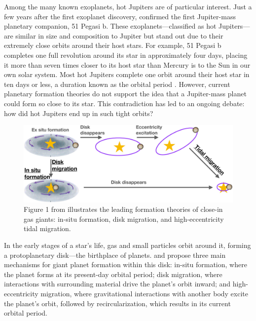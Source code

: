\documentclass[oneside,12pt]{amsart}
\numberwithin{page}{section}
\begin{document}
Among the many known exoplanets, hot Jupiters are of particular interest. Just a few years after the first exoplanet discovery, \citet{mayor1995pegasi51b} confirmed the first Jupiter-mass planetary companion, 51 Pegasi b. These exoplanets—classified as hot Jupiters—are similar in size and composition to Jupiter but stand out due to their extremely close orbits around their host stars. For example, 51 Pegasi b completes one full revolution around its star in approximately four days, placing it more than seven times closer to its host star than Mercury is to the Sun in our own solar system. Most hot Jupiters complete one orbit around their host star in ten days or less, a duration known as the orbital period \citep{fortney2021hotjupiters}. However, current planetary formation theories do not support the idea that a Jupiter-mass planet could form so close to its star. This contradiction has led to an ongoing debate: how did hot Jupiters end up in such tight orbits?

\begin{figure}[htbp]
    \centering
    \includegraphics[width=0.9\linewidth]{figs/hj_formation_theories.jpg}
    \caption{Figure 1 from \citet{fortney2021hotjupiters} illustrates the leading formation theories of close-in gas giants: in-situ formation, disk migration, and high-eccentricity tidal migration.}
    \label{fig:formation-theories}
\end{figure}

In the early stages of a star's life, gas and small particles orbit around it, forming a protoplanetary disk—the birthplace of planets. \citet{fortney2021hotjupiters} and \citet{dawson2018origins} propose three main mechanisms for giant planet formation within this disk: in-situ formation, where the planet forms at its present-day orbital period; disk migration, where interactions with surrounding material drive the planet’s orbit inward; and high-eccentricity migration, where gravitational interactions with another body excite the planet’s orbit, followed by recircularization, which results in its current orbital period.
\end{document}

